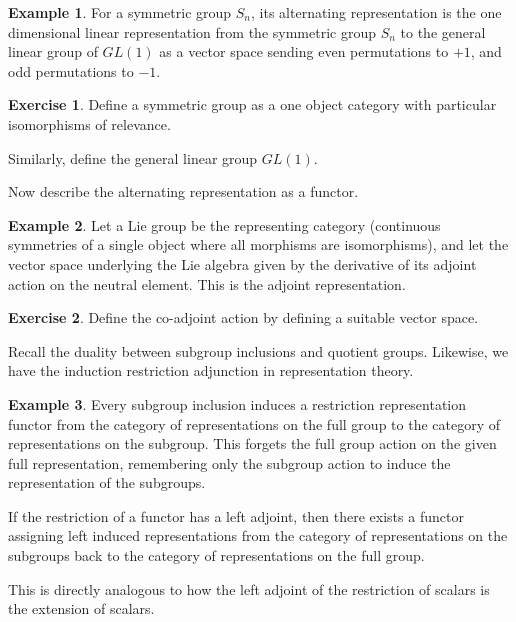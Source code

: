 \documentclass[10pt]{article}
\theoremstyle{plain}%
\theoremstyle{definition}
\newtheorem{example}{Example}[section]
\newtheorem{exercise}{Exercise}[section]
\theoremstyle{remark}
\begin{document}
\begin{example}
	For a symmetric group $S_n$, its alternating representation is the one dimensional linear representation from the symmetric group $S_n$ to the general linear group of $GL(1)$ as a vector space sending even permutations to $+1$, and odd permutations to $-1$.
\end{example}

\begin{exercise}
	Define a symmetric group as a one object category with particular isomorphisms of relevance.

	Similarly, define the general linear group $GL(1)$.

	Now describe the alternating representation as a functor.
\end{exercise}

\begin{example}
	Let a Lie group be the representing category (continuous symmetries of a single object where all morphisms are isomorphisms), and let the vector space underlying the Lie algebra given by the derivative of its adjoint action on the neutral element. This is the adjoint representation.
\end{example}

\begin{exercise}
	Define the co-adjoint action by defining a suitable vector space.
\end{exercise}

Recall the duality between subgroup inclusions and quotient groups. Likewise, we have the induction restriction adjunction in representation theory.

\begin{example}
	Every subgroup inclusion induces a restriction representation functor from the category of representations on the full group to the category of representations on the subgroup. This forgets the full group action on the given full representation, remembering only the subgroup action to induce the representation of the subgroups.

	If the restriction of a functor has a left adjoint, then there exists a functor assigning left induced representations from the category of representations on the subgroups back to the category of representations on the full group. 
	
	This is directly analogous to how the left adjoint of the restriction of scalars is the extension of scalars.
\end{example}
\end{document}
